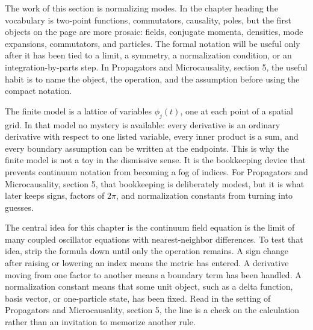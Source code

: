 











The work of this section is normalizing modes.  In the chapter heading the vocabulary is two-point functions, commutators, causality, poles, but the first objects on the page are more prosaic: fields, conjugate momenta, densities, mode expansions, commutators, and particles.  The formal notation will be useful only after it has been tied to a limit, a symmetry, a normalization condition, or an integration-by-parts step.  In Propagators and Microcausality, section 5, the useful habit is to name the object, the operation, and the assumption before using the compact notation.

The finite model is a lattice of variables \(\phi_j(t)\), one at each point of a spatial grid.  In that model no mystery is available: every derivative is an ordinary derivative with respect to one listed variable, every inner product is a sum, and every boundary assumption can be written at the endpoints.  This is why the finite model is not a toy in the dismissive sense.  It is the bookkeeping device that prevents continuum notation from becoming a fog of indices.  For Propagators and Microcausality, section 5, that bookkeeping is deliberately modest, but it is what later keeps signs, factors of \(2\pi\), and normalization constants from turning into guesses.

The central idea for this chapter is the continuum field equation is the limit of many coupled oscillator equations with nearest-neighbor differences.  To test that idea, strip the formula down until only the operation remains.  A sign change after raising or lowering an index means the metric has entered.  A derivative moving from one factor to another means a boundary term has been handled.  A normalization constant means that some unit object, such as a delta function, basis vector, or one-particle state, has been fixed.  Read in the setting of Propagators and Microcausality, section 5, the line is a check on the calculation rather than an invitation to memorize another rule.

